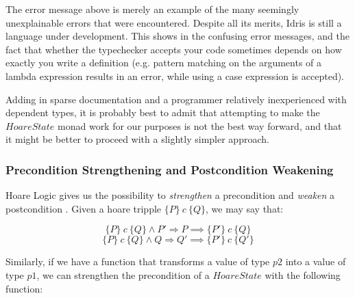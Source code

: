 \documentclass[12pt,a4paper]{article}
\newcommand{\Conid}[1]{\mathit{#1}}
\newcommand{\Varid}[1]{\mathit{#1}}
\begin{document}
The error message above is merely an example of the many seemingly unexplainable errors that were encountered. Despite all its merits, Idris is still a language under development. This shows in the confusing error messages, and the fact that whether the typechecker accepts your code sometimes depends on how exactly you write a definition (e.g. pattern matching on the arguments of a lambda expression results in an error, while using a case expression is accepted). 

Adding in sparse documentation and a programmer relatively inexperienced with dependent types, it is probably best to admit that attempting to make the $HoareState$ monad work for our purposes is not the best way forward, and that it might be better to proceed with a slightly simpler approach.  

\subsubsection{Precondition Strengthening and Postcondition Weakening}

Hoare Logic gives us the possibility to \textit{strengthen} a precondition and \textit{weaken} a postcondition \cite{hoare69}. Given a hoare tripple $\{P\}\ c\ \{Q\}$, we may say that: 

\begin{equation*}
\{P\}\ c\ \{Q\} \land P' \Rightarrow P \implies \{P'\}\ c\ \{Q\}
\end{equation*}
\begin{equation*}
\{P\}\ c\ \{Q\} \land Q \Rightarrow Q' \implies \{P'\}\ c\ \{Q'\}
\end{equation*}

Similarly, if we have a function that transforms a value of type \ensuremath{\Varid{p2}} into a value of type \ensuremath{\Varid{p1}}, we can strengthen the precondition of a \ensuremath{\Conid{HoareState}} with the following function: 
\end{document}
